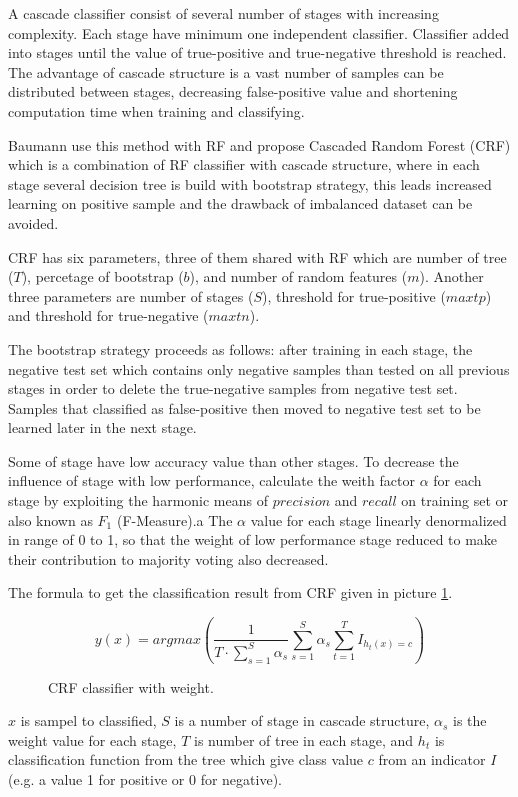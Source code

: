 \documentclass[conference,compsoc,a4paper,twocolumn,final]{IEEEtran}
\begin{document}
A cascade classifier consist of several number of stages with increasing
complexity.
Each stage have minimum one independent classifier.
Classifier added into stages until the value of true-positive and true-negative
threshold is reached.
The advantage of cascade structure is a vast number of samples can be
distributed between stages, decreasing false-positive value and shortening
computation time when training and classifying.

Baumann use this method with RF and propose Cascaded Random Forest (CRF) which
is a combination of RF classifier with cascade structure, where in each stage
several decision tree is build with bootstrap strategy, this leads increased
learning on positive sample and the drawback of imbalanced dataset can be
avoided.
\cite{baumann2013cascaded}

CRF has six parameters, three of them shared with RF which are number of tree
($T$), percetage of bootstrap ($b$), and number of random features ($m$).
Another three parameters are number of stages ($S$), threshold
for true-positive ($maxtp$) and threshold for true-negative ($maxtn$).

The bootstrap strategy proceeds as follows: after training in each stage, the
negative test set which contains only negative samples than tested on all
previous stages in order to delete the true-negative samples from
negative test set.
Samples that classified as false-positive then moved to negative test set to be
learned later in the next stage.

Some of stage have low accuracy value than other stages.
To decrease the influence of stage with low performance, calculate the weith
factor $\alpha$ for each stage by exploiting the harmonic means of $precision$
and $recall$ on training set or also known as $F_1$ (F-Measure).a
The $\alpha$ value for each stage linearly denormalized in range of 0 to 1, so
that the weight of low performance stage reduced to make their contribution to
majority voting also decreased.

The formula to get the classification result from CRF given in picture
\ref{form:crf}.

\begin{figure}[h]
\[
	y(x) = argmax \left(
			\frac{1}{T \cdot \sum^{S}_{s=1} \alpha_{s} }
			\sum\limits_{s=1}^{S} \alpha_{s}
			\sum\limits^{T}_{t=1} I_{h_{t} (x) = c}
		\right)
\]
\caption{CRF classifier with weight.}
\label{form:crf}
\end{figure}

$x$ is sampel to classified,
$S$ is a number of stage in cascade structure,
$\alpha_{s}$ is the weight value for each stage,
$T$ is number of tree in each stage, and
$h_{t}$ is classification function from the tree which give class value $c$
from an indicator $I$ (e.g. a value 1 for positive or 0 for negative).
\end{document}

